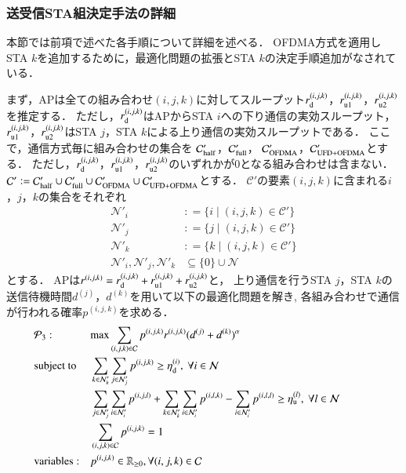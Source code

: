 \documentclass[master]{kuisthesis}		%
\def\equiv{\mathrel{\mathop:}=}
\newcommand{\sijk}{(i,j,k)}
\newcommand{\rijk}{r^{(i,j,k)}}
\newcommand{\mthcd}{{\mathcal C}'}
\newcommand{\mthni}{{\mathcal N}'_i}
\newcommand{\mthnj}{{\mathcal N}'_j}
\newcommand{\mthnk}{{\mathcal N}'_k}
\begin{document}
		\subsubsection{送受信STA組決定手法の詳細}
			本節では前項で述べた各手順について詳細を述べる．
			OFDMA方式を適用しSTA $k$を追加するために，最適化問題の拡張とSTA $k$の決定手順追加がなされている．
			\par
			まず，APは全ての組み合わせ$(i,j,k)$に対してスループット$r^{(i,j,k)}_{\rm d}$，$r^{(i,j,k)}_{\rm u1}$，$r^{(i,j,k)}_{\rm u2}$を推定する．
			ただし，$r^{(i,j,k)}_{\rm d}$はAPからSTA $i$への下り通信の実効スループット，$r^{(i,j,k)}_{\rm u1}$，$r^{(i,j,k)}_{\rm u2}$はSTA $j$，STA $k$による上り通信の実効スループットである．
			ここで，通信方式毎に組み合わせの集合を
			${\mathcal C}'_{\rm half}$，${\mathcal C}'_{\rm full}$，
			${\mathcal C}'_{\rm OFDMA}$，${\mathcal C}'_{\rm UFD+OFDMA}$とする．
			ただし，$r^{(i,j,k)}_{\rm d}$，$r^{(i,j,k)}_{\rm u1}$，$r^{(i,j,k)}_{\rm u2}$のいずれかが0となる組み合わせは含まない．
			${\mathcal C}'\equiv{\mathcal C}'_{\rm half}\cup{\mathcal C}'_{\rm full}\cup{\mathcal C}'_{\rm OFDMA}\cup{\mathcal C}'_{\rm UFD+OFDMA}$とする．
			$\mthcd$の要素$\sijk$に含まれる$i$，$j$，$k$の集合をそれぞれ
			\begin{align}
				\mthni &\equiv\{i\mid\sijk\in\mthcd\}\\
				\mthnj &\equiv\{j\mid\sijk\in\mthcd\}\\
				\mthnk &\equiv\{k\mid\sijk\in\mthcd\}\\
				\mthni,\mthnj,\mthnk&\subseteq \{0\}\cup{\mathcal N}
			\end{align}
			とする．
			APは$\rijk=r^{(i,j,k)}_{\rm d}+r^{(i,j,k)}_{\rm u1}+r^{(i,j,k)}_{\rm u2}$と，
			上り通信を行うSTA $j$，STA $k$の送信待機時間$d^{(j)}$，$d^{(k)}$を用いて以下の最適化問題を解き,
			各組み合わせで通信が行われる確率$p^{(i,j,k)}$を求める．
			\begin{align}
				&{\mathcal P}_3: && {\rm max} \sum_{(i,j,k)\in{\mathcal C}} p^{(i,j,k)}r^{(i,j,k)}(d^{(j)}+d^{(k)})^{\alpha} &&&&&&\\
				&{\rm subject\ to} && \sum_{k\in\mthnk} \sum_{j\in\mthnj} p^{(i,j,k)} \geq \eta_{\rm d}^{(i)},\ \forall i\in {\mathcal N} \label{eq:etad} \\
				&&& \sum_{j\in\mthnj} \sum_{i\in\mthni} p^{(i,j,l)}+\sum_{k\in\mthnk} \sum_{i\in\mthni} p^{(i,l,k)}- \sum_{i\in\mthni} p^{(i,l,l)} \geq \eta_{\rm u}^{(l)},\ \forall l\in {\mathcal N} \label{eq:etau} \\
				&&& \sum_{(i,j,k)\in{\mathcal C}} p^{(i,j,k)}=1 \\
				&{\rm variables:} &&p^{(i,j,k)} \in {\mathbb R}_{\geq 0},\forall(i,j,k)\in {\mathcal C}
			\end{align}
\end{document}
